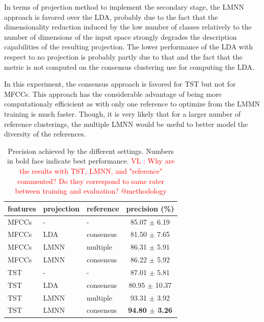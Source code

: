 \documentclass{article}
\newcommand{\vl}[1]{\textcolor{red}{VL : #1}}
\begin{document}
In terms of projection method to implement the secondary stage, the LMNN approach is favored over the LDA, probably due to the fact that the dimensionality reduction induced by the low number of classes relatively to the number of dimensions of the input space strongly degrades the description capabilities of the resulting projection. The lower performance of the LDA with respect to no projection is probably partly due to that and the fact that the metric is not computed on the consensus clustering use for computing the LDA.

In this experiment, the consensus approach is favored for TST but not for MFCCs. This approach has the considerable advantage of being more computationaly efficicient as with only one reference to optimize from the LMMN training is much faster. Though, it is very likely that for a larger number of reference clusterings, the multiple LMNN would be useful to better model the diversity of the references.


\begin{table}
  \caption{Precision achieved by the different settings. Numbers in bold face indicate best performance. \vl{Why are the results with TST, LMNN, and "reference" commented? Do they correspond to same rater between training and evaluation? @methodology}}
  \label{tab:res1}
  \begin{center}
\begin{tabular}{lllc}
features & projection & reference & precision (\%) \\
  \hline
  MFCCs & - & - &   85.07 $\pm$ 6.19 \\
  MFCCs & LDA &  consensus  &   81.50 $\pm$ 7.65 \\
MFCCs & LMNN & multiple & 86.31 $\pm$ 5.91 \\
MFCCs & LMNN & consensus &   86.22 $\pm$ 5.92 \\
TST & - & - &   87.01 $\pm$ 5.81 \\
TST & LDA & consensus &   80.95 $\pm$ 10.37 \\
TST & LMNN  & multiple  &   93.31 $\pm$ 3.92 \\
TST & LMNN & consensus &   \textbf{94.80 $\pm$ 3.26} \\
\end{tabular}
\end{center}
\end{table}
\end{document}
